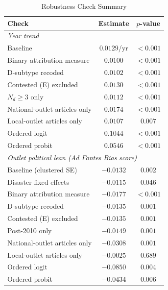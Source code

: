 \documentclass[12pt]{article}
\begin{document}
\begin{table}[ht]
\centering
\caption{Robustness Check Summary}
\label{tab:robustness_summary}
\begin{threeparttable}
\begin{tabular}{lcc}
\toprule
Check & Estimate & $p$-value \\
\midrule
\multicolumn{3}{l}{\emph{Year trend}} \\
\quad Baseline                              & $0.0129$/yr & $<0.001$ \\
\quad Binary attribution measure            & $0.0100$    & $<0.001$ \\
\quad D-subtype recoded                     & $0.0102$    & $<0.001$ \\
\quad Contested (E) excluded                & $0.0130$    & $<0.001$ \\
\quad $N_d \geq 3$ only                     & $0.0112$    & $<0.001$ \\
\quad National-outlet articles only         & $0.0174$    & $<0.001$ \\
\quad Local-outlet articles only            & $0.0107$    & $0.007$ \\
\quad Ordered logit                         & $0.1044$    & $<0.001$ \\
\quad Ordered probit                        & $0.0546$    & $<0.001$ \\
\midrule
\multicolumn{3}{l}{\emph{Outlet political lean (Ad Fontes Bias score)}} \\
\quad Baseline (clustered SE)               & $-0.0132$   & $0.002$ \\
\quad Disaster fixed effects                & $-0.0115$   & $0.046$ \\
\quad Binary attribution measure            & $-0.0177$   & $<0.001$ \\
\quad D-subtype recoded                     & $-0.0135$   & $0.001$ \\
\quad Contested (E) excluded                & $-0.0135$   & $0.001$ \\
\quad Post-2010 only                        & $-0.0149$   & $0.001$ \\
\quad National-outlet articles only         & $-0.0308$   & $0.001$ \\
\quad Local-outlet articles only            & $-0.0025$   & $0.689$ \\
\quad Ordered logit                         & $-0.0850$   & $0.004$ \\
\quad Ordered probit                        & $-0.0434$   & $0.006$ \\

\end{tabular}
\end{threeparttable}
\end{table}
\end{document}
